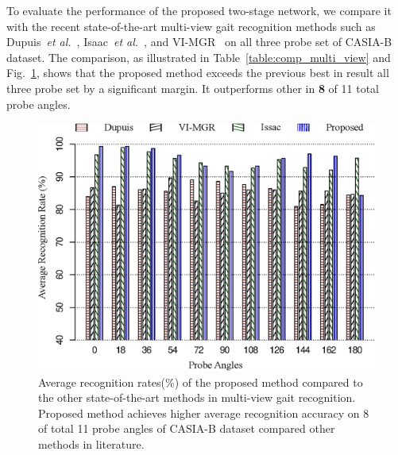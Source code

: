 To evaluate the performance of the proposed two-stage network, we compare it with the recent state-of-the-art multi-view gait recognition methods such as Dupuis~\textit{et al.}~\cite{Dupuis_13}, Isaac~\textit{et al.}~\cite{Isaac_17}, and VI-MGR~\cite{Choudhury_15} on all three probe set of CASIA-B dataset. The comparison, as illustrated in Table~\ref{table:comp_multi_view} and Fig.~\ref{fig:comp_casia_b_multi_view}, shows that the proposed method exceeds the previous best in result all three probe set by a significant margin. It outperforms other in \textbf{8} of 11 total probe angles.

\begin{figure}[t]
	\centering
	\includegraphics[width = 120mm]{figures/comp_casia_b_multi_view.eps}
	\caption{
		Average recognition rates(\%) of the proposed method compared to the other state-of-the-art methods in multi-view gait recognition. Proposed method achieves higher average recognition accuracy on 8 of total 11 probe angles of CASIA-B dataset compared other methods in literature.
	}
	\label{fig:comp_casia_b_multi_view}
\end{figure}


\endinput